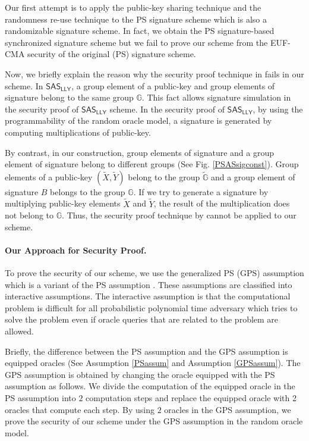 \documentclass[a4paper,11pt]{fullverllncs}
\newcommand{\G}{\mathbb{G}}
\newcommand{\LLY}{\mathsf{LLY}}
\newcommand{\SAS}{\mathsf{SAS}}
\begin{document}
Our first attempt is to apply the public-key sharing technique and the randomness re-use technique to the PS signature scheme which is also a randomizable signature scheme.
In fact, we obtain the PS signature-based synchronized signature scheme but we fail to prove our scheme from the EUF-CMA security of the original (PS) signature scheme.

Now, we briefly explain the reason why the security proof technique in \cite{LLY13} fails in our scheme.
In $\SAS_{\LLY}$, a group element of a public-key and group elements of signature belong to the same group $\G$.
This fact allows signature simulation in the security proof of $\SAS_{\LLY}$ scheme.
In the security proof of $\SAS_{\LLY}$, by using the programmability of the random oracle model, a signature is generated by computing multiplications of public-key.

By contrast, in our construction, group elements of signature and a group element of signature belong to different groups (See Fig. \ref{PSASsigconst}).
Group elements of a public-key $(\tilde{X}, \tilde{Y})$ belong to the group  $\widetilde{\G}$ and a group element of signature $B$ belongs to the group $\G$.
If we try to generate a signature by multiplying public-key elements $\tilde{X}$ and $\tilde{Y}$, the result of the multiplication does not belong to $\G$.
Thus, the security proof technique by \cite{LLY13} cannot be applied to our scheme.


\paragraph{\bf Our Approach for Security Proof.}
To prove the security of our scheme, we use the generalized PS  (GPS) assumption \cite{KLAP21} which is a variant of the PS assumption \cite{PS16}.
These assumptions are classified into interactive assumptions.
The interactive assumption is that the computational problem is difficult for all probabilistic polynomial time adversary which tries to solve the problem even if oracle queries that are related to the problem are allowed.

Briefly, the difference between the PS assumption and the GPS assumption is equipped oracles (See Assumption \ref{PSassum} and Assumption \ref{GPSassum}).
The GPS assumption is obtained by changing the oracle equipped with the PS assumption as follows.
We divide the computation of the equipped oracle in the PS assumption into $2$ computation steps and replace the equipped oracle with 2 oracles that compute each step.
By using $2$ oracles in the GPS assumption, we prove the security of our scheme under the GPS assumption in the random oracle model.
\end{document}
